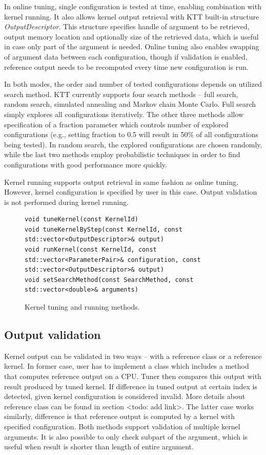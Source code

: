 \documentclass
[
    digital, %
    oneside, %
    table, %
    nolof, %
    nolot, %
    nocover %
]{fithesis3}
\begin{document}
In online tuning, single configuration is tested at time, enabling combination with kernel running. It also allows kernel output retrieval with
KTT built-in structure \textit{OutputDescriptor}. This structure specifies handle of argument to be retrieved, output memory location and optionally
size of the retrieved data, which is useful in case only part of the argument is needed. Online tuning also enables swapping of argument data between
each configuration, though if validation is enabled, reference output needs to be recomputed every time new configuration is run.

In both modes, the order and number of tested configurations depends on utilized search method. KTT currently supports four search methods -- full
search, random search, simulated annealing and Markov chain Monte Carlo. Full search simply explores all configurations iteratively. The other three
methods allow specification of a fraction parameter which controls number of explored configurations (e.g., setting fraction to 0.5 will result in
50\% of all configurations being tested). In random search, the explored configurations are chosen randomly, while the last two methods employ
probabilistic techniques in order to find configurations with good performance more quickly.

Kernel running supports output retrieval in same fashion as online tuning. However, kernel configuration is specified by user in this case. Output
validation is not performed during kernel running.

\begin{figure}
\begin{lstlisting}
void tuneKernel(const KernelId)
void tuneKernelByStep(const KernelId, const std::vector<OutputDescriptor>& output)
void runKernel(const KernelId, const std::vector<ParameterPair>& configuration, const std::vector<OutputDescriptor>& output)
void setSearchMethod(const SearchMethod, const std::vector<double>& arguments)
\end{lstlisting}
\caption{Kernel tuning and running methods.}
\label{ktt-tuning-methods}
\end{figure}

\subsection{Output validation}
Kernel output can be validated in two ways -- with a reference class or a reference kernel. In former case, user has to implement a class which
includes a method that computes reference output on a CPU. Tuner then compares this output with result produced by tuned kernel. If difference in tuned
output at certain index is detected, given kernel configuration is considered invalid. More details about reference class can be found in section <todo: add link>.
The latter case works similarly, difference is that reference output is computed by a kernel with specified configuration. Both methods support
validation of multiple kernel arguments. It is also possible to only check subpart of the argument, which is useful when result is shorter than length
of entire argument.
\end{document}
